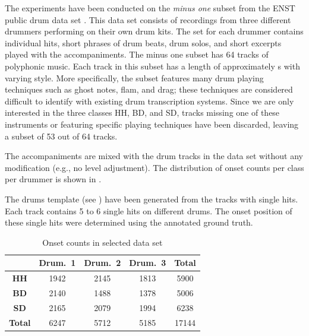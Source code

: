 \documentclass{article}
\begin{document}
The experiments have been conducted on the \textit{minus one} subset from the ENST public drum data set \cite{gillet_enst-drums:_2006}. This data set consists of recordings from three different drummers performing on their own drum kits. The set for each drummer contains individual hits, short phrases of drum beats, drum solos, and short excerpts played with the accompaniments. The minus one subset has 64 tracks of polyphonic music. Each track in this subset has a length of approximately \unit[70]{s} with varying style. More specifically, the subset features many drum playing techniques such as ghost notes, flam, and drag; these techniques are considered difficult to identify with existing drum transcription systems. Since we are only interested in the three classes HH, BD, and SD, tracks missing one of these instruments or featuring specific playing techniques have been discarded, leaving a subset of 53 out of 64 tracks.

The accompaniments are mixed with the drum tracks in the data set without any modification (e.g., no level adjustment). The distribution of onset counts per class per drummer is shown in . %

The drums template (see ) have been generated from the tracks with single hits. Each track contains 5 to 6 single hits on different drums. The onset position of these single hits were determined using the annotated ground truth. 
 
\begin{table}[h]
\begin{center}
\begin{tabular}{|c|c|c|c|c|}
\hline
 & \textbf{Drum.~1}    & \textbf{Drum.~2}    & \textbf{Drum.~3}    & \textbf{Total} \\ \hline
\textbf{HH}        & 1942 & 2145 & 1813 & 5900  \\ \hline
\textbf{BD}        & 2140 & 1488 & 1378 & 5006  \\ \hline
\textbf{SD}        & 2165 & 2079 & 1994 & 6238  \\ \hline
\textbf{Total}     & 6247 & 5712 & 5185 & 17144 \\ \hline
\end{tabular}
 \caption{Onset counts in selected data set}%
 \label{tab:onsetCount}
\end{center}
\end{table}
\end{document}
